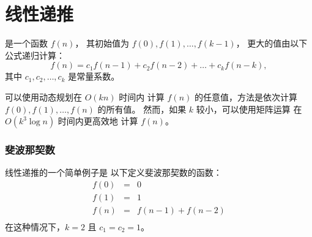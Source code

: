 \section{线性递推}


是一个函数 $f(n)$，
其初始值为
$f(0),f(1),\ldots,f(k-1)$，
更大的值由以下公式递归计算：
\[f(n) = c_1 f(n-1) + c_2 f(n-2) + \ldots + c_k f (n-k),\]
其中 $c_1,c_2,\ldots,c_k$ 是常量系数。

可以使用动态规划在 $O(kn)$ 时间内
计算 $f(n)$ 的任意值，方法是依次计算
$f(0),f(1),\ldots,f(n)$ 的所有值。
然而，如果 $k$ 较小，可以使用矩阵运算
在 $O(k^3 \log n)$ 时间内更高效地
计算 $f(n)$。

\subsubsection{斐波那契数}


线性递推的一个简单例子是
以下定义斐波那契数的函数：
\[
\begin{array}{lcl}
f(0) & = & 0 \\
f(1) & = & 1 \\
f(n) & = & f(n-1)+f(n-2) \\
\end{array}
\]
在这种情况下，$k=2$ 且 $c_1=c_2=1$。

